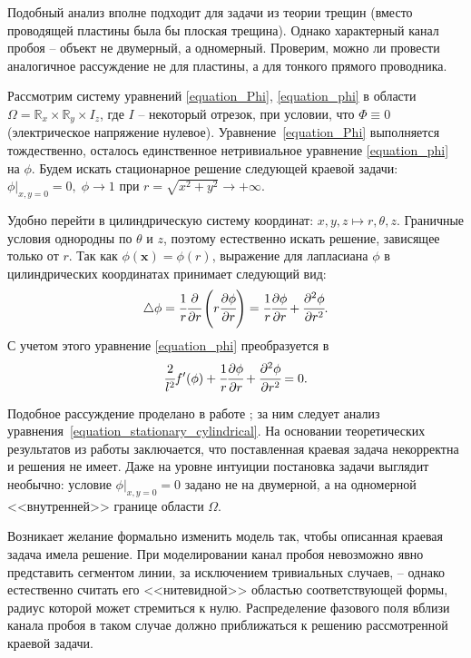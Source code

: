 \documentclass[a4paper,12pt]{article}
\theoremstyle{plain}
\theoremstyle{definition}
\begin{document}
Подобный анализ вполне подходит для задачи из теории трещин (вместо проводящей пластины была бы плоская трещина). Однако характерный канал пробоя -- объект не двумерный, а одномерный. Проверим, можно ли провести аналогичное рассуждение не для пластины, а для тонкого прямого проводника.

Рассмотрим систему уравнений \eqref{equation_Phi}, \eqref{equation_phi} в области $\Omega = \mathbb{R}_x \times \mathbb{R}_y \times I_z$, где $I$ -- некоторый отрезок, при условии, что $\Phi \equiv 0$ (электрическое напряжение нулевое). Уравнение~\eqref{equation_Phi} выполняется тождественно, осталось единственное нетривиальное уравнение \eqref{equation_phi} на $\phi$. Будем искать стационарное решение следующей краевой задачи: $\phi|_{x, y = 0} = 0, \; \phi \to 1$ при $r = \sqrt{x^2 + y^2} \to +\infty$.

Удобно перейти в цилиндрическую систему координат: $x, y, z \longmapsto r, \theta, z$. Граничные условия однородны по $\theta$ и $z$, поэтому естественно искать решение, зависящее только от $r$. Так как $\phi(\mathbf{x}) = \phi(r)$, выражение для лапласиана $\phi$ в цилиндрических координатах принимает следующий вид:
$$\triangle \phi = \cfrac{1}{r} \cfrac{\partial}{\partial r} \left( r \cfrac{\partial \phi}{\partial r} \right) = \cfrac{1}{r} \cfrac{\partial \phi}{\partial r} + \cfrac{\partial ^2 \phi}{\partial r^2} \text{.}$$
С учетом этого уравнение \eqref{equation_phi} преобразуется в
\begin{equation}
    \cfrac{2}{l^2} f'(\phi) + \cfrac{1}{r} \cfrac{\partial \phi}{\partial r} + \cfrac{\partial ^2 \phi}{\partial r^2} = 0 \text{.}
    \label{equation_stationary_cylindrical}
\end{equation}

Подобное рассуждение проделано в работе \cite{zipunova_higher_codimension}; за ним следует анализ уравнения~\eqref{equation_stationary_cylindrical}. На основании теоретических результатов из работы \cite{cirstea_elliptic_equations} заключается, что поставленная краевая задача некорректна и решения не имеет. Даже на уровне интуиции постановка задачи выглядит необычно: условие $\phi|_{x, y = 0} = 0$ задано не на двумерной, а на одномерной <<внутренней>> границе области $\Omega$.

Возникает желание формально изменить модель так, чтобы описанная краевая задача имела решение. При моделировании канал пробоя невозможно явно представить сегментом линии, за исключением тривиальных случаев, -- однако естественно считать его <<нитевидной>> областью соответствующей формы, радиус которой может стремиться к нулю. Распределение фазового поля вблизи канала пробоя в таком случае должно приближаться к решению рассмотренной краевой задачи.
\end{document}
